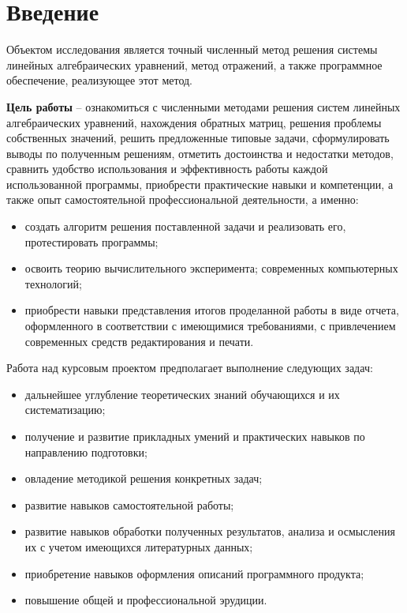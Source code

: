 \section{Введение}
    Объектом исследования является точный численный метод решения системы линейных алгебраических уравнений, метод отражений, а также программное обеспечение, реализующее этот метод.
    
    \textbf{Цель работы} -- ознакомиться с численными методами решения систем линейных алгебраических уравнений, нахождения обратных матриц, решения проблемы собственных значений, решить предложенные типовые задачи, сформулировать выводы по полученным решениям, отметить достоинства и недостатки методов, сравнить удобство использования и эффективность работы каждой использованной программы, приобрести практические навыки и компетенции, а также опыт самостоятельной профессиональной деятельности, а именно:
    \begin{itemize}
        \setlength{\itemsep}{0em}
        \item создать алгоритм решения поставленной задачи и реализовать его, протестировать программы;
        \item освоить теорию вычислительного эксперимента; современных компьютерных технологий;
        \item приобрести навыки представления итогов проделанной работы в виде отчета, оформленного в соответствии с имеющимися требованиями, с привлечением современных средств редактирования и печати.
    \end{itemize}

    Работа над курсовым проектом предполагает выполнение следующих задач:
    \begin{itemize}
        \setlength{\itemsep}{0em}
        \item дальнейшее углубление теоретических знаний обучающихся и их систематизацию;
        \item получение и развитие прикладных умений и практических навыков по направлению подготовки;
        \item овладение методикой решения конкретных задач;
        \item развитие навыков самостоятельной работы;
        \item развитие навыков обработки полученных результатов, анализа и осмысления их с учетом имеющихся литературных данных;
        \item приобретение навыков оформления описаний программного продукта;
        \item повышение общей и профессиональной эрудиции.
    \end{itemize}
